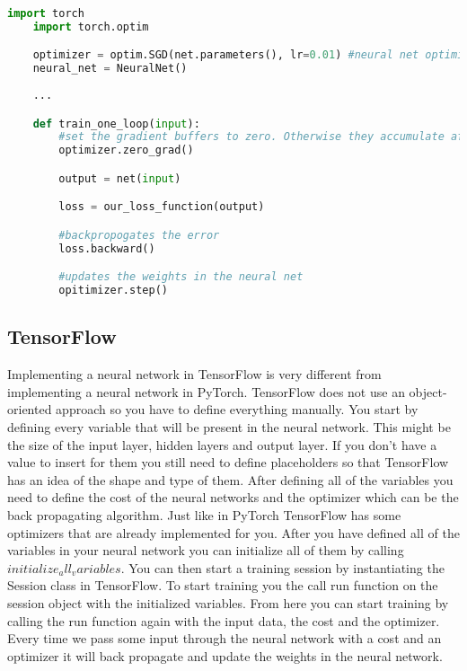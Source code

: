 \begin{lstlisting}[language=Python]
	import torch
	import torch.optim

	optimizer = optim.SGD(net.parameters(), lr=0.01) #neural net optimizer using SGD update rules
	neural_net = NeuralNet()
	
	...

	def train_one_loop(input):
		#set the gradient buffers to zero. Otherwise they accumulate after every loop
		optimizer.zero_grad() 

		output = net(input)

		loss = our_loss_function(output)

		#backpropogates the error
		loss.backward() 

		#updates the weights in the neural net
		opitimizer.step() 

\end{lstlisting}

\subsection{TensorFlow}
Implementing a neural network in TensorFlow is very different from implementing a neural network in PyTorch.
TensorFlow does not use an object-oriented approach so you have to define everything manually.
You start by defining every variable that will be present in the neural network.
This might be the size of the input layer, hidden layers and output layer.
If you don't have a value to insert for them you still need to define placeholders so that TensorFlow has an idea of the shape and type of them.
After defining all of the variables you need to define the cost of the neural networks and the optimizer which can be the back propagating algorithm.
Just like in PyTorch TensorFlow has some optimizers that are already implemented for you. 
After you have defined all of the variables in your neural network you can initialize all of them by calling \textit{$initialize_all_variables$}.
You can then start a training session by instantiating the Session class in TensorFlow.
To start training you the call run function on the session object with the initialized variables.
From here you can start training by calling the run function again with the input data, the cost and the optimizer.
Every time we pass some input through the neural network with a cost and an optimizer it will back propagate and update the weights in the neural network.

